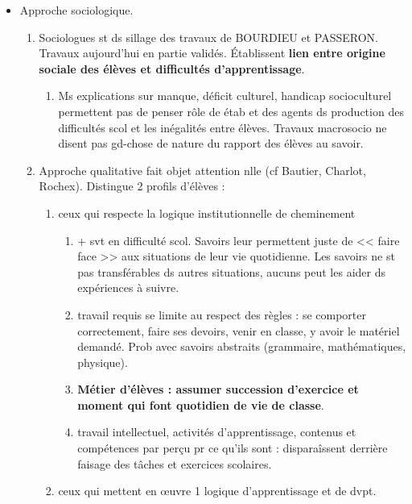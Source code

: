\documentclass[12pt]{report}
\begin{document}
\begin{itemize}
\begin{itemize}
\item Approche sociologique.
\begin{enumerate}
\item Sociologues st ds sillage des travaux de BOURDIEU et PASSERON. Travaux aujourd'hui en partie validés. Établissent \textbf{lien entre origine sociale des élèves et difficultés d'apprentissage}. \\
\begin{enumerate}
\item Ms explications sur manque, déficit culturel, handicap socioculturel permettent pas de penser rôle de étab et des agents ds production des difficultés scol et les inégalités entre élèves. Travaux macrosocio ne disent pas gd-chose de nature du rapport des élèves au savoir.\\
\end{enumerate}

\item Approche qualitative fait objet attention nlle (cf Bautier, Charlot, Rochex). Distingue 2 profils d'élèves : 
\begin{enumerate}
\item ceux qui respecte la logique institutionnelle de cheminement \\
 
 \begin{enumerate}
 \item + svt en difficulté scol. Savoirs leur permettent juste de << faire face >> aux situations de leur vie quotidienne. Les savoirs ne st pas transférables ds autres situations, aucuns peut les aider ds expériences à suivre. \\
 \item travail requis se limite au respect des règles : se comporter correctement, faire ses devoirs, venir en classe, y avoir le matériel demandé. Prob avec savoirs abstraits (grammaire, mathématiques, physique). \\
 \item \textbf{Métier d'élèves : assumer succession d'exercice et moment qui font quotidien de vie de classe}. \\
 \item travail intellectuel, activités d'apprentissage, contenus et compétences par perçu pr ce qu'ils sont : disparaîssent derrière faisage des tâches et exercices scolaires.
 \end{enumerate}
 
\item ceux qui mettent en œuvre 1 logique d'apprentissage et de dvpt.


\end{enumerate}
\end{enumerate}
\end{itemize}
\end{itemize}
\end{document}
